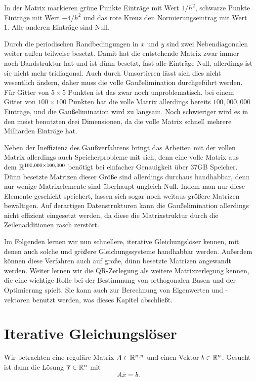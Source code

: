 In der Matrix markieren grüne Punkte Einträge mit Wert $1/h^2$,
schwarze Punkte Einträge mit Wert $-4/h^2$ und das rote Kreuz den
Normierungseintrag mit Wert 1. Alle anderen Einträge sind Null.

Durch die periodischen Randbedingungen in $x$ und $y$ sind zwei
Nebendiagonalen weiter außen teilweise besetzt. Damit hat die
entstehende Matrix zwar immer noch Bandstruktur hat und ist dünn
besetzt, \dh fast alle Einträge Null, allerdings ist sie nicht mehr
tridiagonal. Auch durch Umsortieren lässt sich dies nicht wesentlich
ändern, daher muss die volle Gaußelimination durchgeführt werden. Für
Gitter von $5\times 5$ Punkten ist das zwar noch unproblematisch, bei
einem Gitter von $100\times 100$ Punkten hat die volle Matrix
allerdings bereits $100,000,000$ Einträge, und die Gaußelimination
wird zu langsam. Noch schwieriger wird es in den meist benutzten
drei Dimensionen, da die volle Matrix schnell mehrere Milliarden
Einträge hat.

Neben der Ineffizienz des Gaußverfahrens bringt das Arbeiten mit der
vollen Matrix allerdings auch Speicherprobleme mit sich, denn eine
volle Matrix aus dem $\mathbb{R}^{100,000\times 100,000}$ benötigt bei
einfacher Genauigkeit über 37GB Speicher. Dünn besetzte Matrizen
dieser Größe sind allerdings durchaus handhabbar, denn nur wenige
Matrixelemente sind überhaupt ungleich Null. Indem man nur diese
Elemente geschickt speichert, lassen sich sogar noch weitaus größere
Matrizen bewältigen. Auf derartigen Datenstrukturen kann die
Gaußelimination allerdings nicht effizient eingesetzt werden, da diese
die Matrixstruktur durch die Zeilenadditionen rasch zerstört.

Im Folgenden lernen wir nun schnellere, iterative Gleichungslöser
kennen, mit denen auch solche und größere Gleichungssysteme handhabbar
werden. Außerdem können diese Verfahren auch auf große, dünn besetzte
Matrizen angewandt werden. Weiter lernen wir die QR-Zerlegung als
weitere Matrixzerlegung kennen, die eine wichtige Rolle bei der
Bestimmung von orthogonalen Basen und der 
Optimierung spielt. Sie kann auch zur Berechnung von Eigenwerten und
-vektoren benutzt werden, was dieses Kapitel abschließt.

\section{Iterative Gleichungslöser}

Wir betrachten eine reguläre Matrix $A\in\mathbb{R}^{n,n}$ und einen Vektor
$b\in\mathbb{R}^n$. Gesucht ist dann die Lösung $\overline{x}\in\mathbb{R}^n$ mit
\begin{equation}
  \label{eq:axb}
  A\overline{x} = b.
\end{equation}

